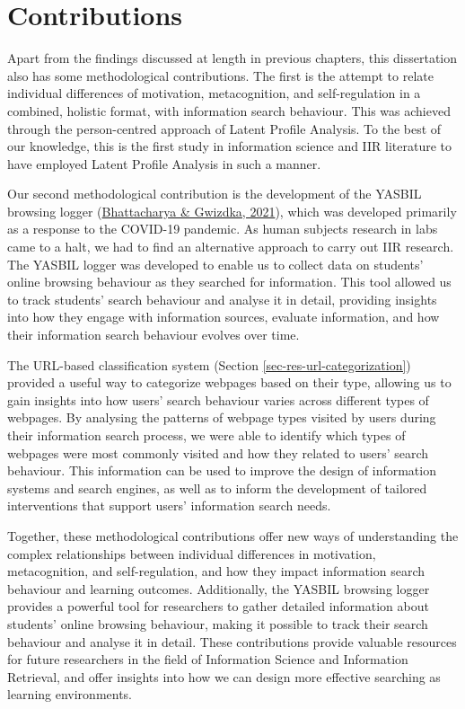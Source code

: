 \documentclass[letterpaper, nobind]{templates/ociamthesis}
\begin{document}
\hypertarget{contributions}{%
\section{Contributions}\label{contributions}}

Apart from the findings discussed at length in previous chapters, this dissertation also has some methodological contributions.
The first is the attempt to relate individual differences of motivation, metacognition, and self-regulation in a combined, holistic format, with information search behaviour.
This was achieved through the person-centred approach of Latent Profile Analysis.
To the best of our knowledge, this is the first study in information science and IIR literature to have employed Latent Profile Analysis in such a manner.

Our second methodological contribution is the development of the YASBIL browsing logger (\protect\hyperlink{ref-bhattacharya2021yasbil}{Bhattacharya \& Gwizdka, 2021}), which was developed primarily as a response to the COVID-19 pandemic.
As human subjects research in labs came to a halt, we had to find an alternative approach to carry out IIR research.
The YASBIL logger was developed to enable us to collect data on students' online browsing behaviour as they searched for information. This tool allowed us to track students' search behaviour and analyse it in detail, providing insights into how they engage with information sources, evaluate information, and how their information search behaviour evolves over time.

The URL-based classification system (Section \ref{sec-res-url-categorization}) provided a useful way to categorize webpages based on their type, allowing us to gain insights into how users' search behaviour varies across different types of webpages. By analysing the patterns of webpage types visited by users during their information search process, we were able to identify which types of webpages were most commonly visited and how they related to users' search behaviour. This information can be used to improve the design of information systems and search engines, as well as to inform the development of tailored interventions that support users' information search needs.

Together, these methodological contributions offer new ways of understanding the complex relationships between individual differences in motivation, metacognition, and self-regulation, and how they impact information search behaviour and learning outcomes. Additionally, the YASBIL browsing logger provides a powerful tool for researchers to gather detailed information about students' online browsing behaviour, making it possible to track their search behaviour and analyse it in detail. These contributions provide valuable resources for future researchers in the field of Information Science and Information Retrieval, and offer insights into how we can design more effective searching as learning environments.
\end{document}
